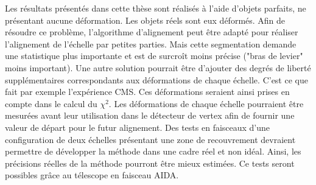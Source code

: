 
\medskip

Les r\'esultats pr\'esent\'es dans cette th\`ese sont r\'ealis\'es \`a l'aide d'objets parfaits, ne pr\'esentant aucune d\'eformation. Les objets r\'eels sont eux d\'eform\'es. Afin de r\'esoudre ce probl\`eme, l'algorithme d'alignement peut \^etre adapt\'e pour r\'ealiser l'alignement de l'\'echelle par petites parties. Mais cette segmentation demande une statistique plus importante et est de surcro\^it moins pr\'ecise ("bras de levier" moins important). Une autre solution pourrait \^etre d'ajouter des degr\'es de libert\'e suppl\'ementaires correspondants aux d\'eformations de chaque \'echelle. C'est ce que fait par exemple l'exp\'erience CMS. Ces d\'eformations seraient ainsi prises en compte dans le calcul du $\chi^2$. Les d\'eformations de chaque \'echelle pourraient \^etre mesur\'ees avant leur utilisation dans le d\'etecteur de vertex afin de fournir une valeur de d\'epart pour le futur alignement. Des tests en faisceaux d'une configuration de deux \'echelles pr\'esentant une zone de recouvrement devraient permettre de d\'evelopper la m\'ethode dans une cadre r\'eel et non id\'eal. Ainsi, les pr\'ecisions r\'eelles de la m\'ethode pourront \^etre mieux estim\'ees. Ce tests seront possibles grâce au télescope en faisceau AIDA.

